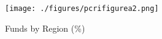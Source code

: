 
\begin{figure}[tb]
    \centering
\texttt{[image: ./figures/pcrifigurea2.png]}
\caption{Funds by Region (\%)\label{fig:pcrifigurea2}}
\end{figure}
